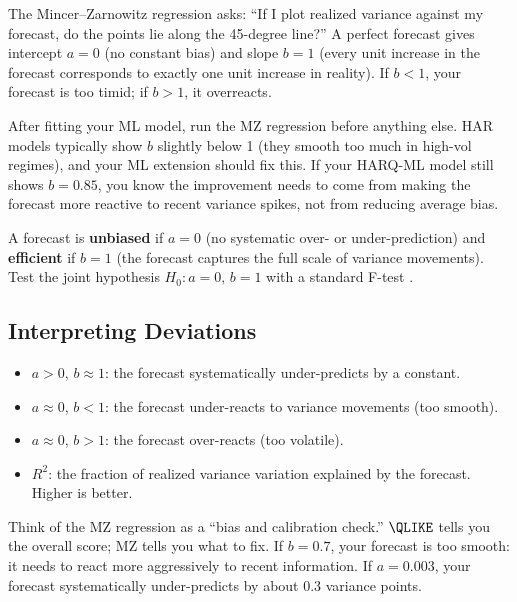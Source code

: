 \begin{intuition}
The Mincer--Zarnowitz regression asks: ``If I plot realized variance against my forecast, do the points lie along the 45-degree line?''
A perfect forecast gives intercept $a = 0$ (no constant bias) and slope $b = 1$ (every unit increase in the forecast corresponds to exactly one unit increase in reality).
If $b < 1$, your forecast is too timid; if $b > 1$, it overreacts.
\end{intuition}

\begin{projectconnection}
After fitting your ML model, run the MZ regression before anything else.
HAR models typically show $b$ slightly below 1 (they smooth too much in high-vol regimes), and your ML extension should fix this.
If your HARQ-ML model still shows $b = 0.85$, you know the improvement needs to come from making the forecast more reactive to recent variance spikes, not from reducing average bias.
\end{projectconnection}

\begin{definition}
A forecast is \textbf{unbiased} if $a = 0$ (no systematic over- or under-prediction) and \textbf{efficient} if $b = 1$ (the forecast captures the full scale of variance movements).
Test the joint hypothesis $H_0: a = 0, \, b = 1$ with a standard F-test \citep{MincerZarnowitz1969}.
\end{definition}

\subsection{Interpreting Deviations}

\begin{itemize}[nosep]
  \item $a > 0$, $b \approx 1$: the forecast systematically under-predicts by a constant.
  \item $a \approx 0$, $b < 1$: the forecast under-reacts to variance movements (too smooth).
  \item $a \approx 0$, $b > 1$: the forecast over-reacts (too volatile).
  \item $R^2$: the fraction of realized variance variation explained by the forecast. Higher is better.
\end{itemize}

\begin{intuition}
Think of the MZ regression as a ``bias and calibration check.''
$\QLIKE$ tells you the overall score; MZ tells you what to fix.
If $b = 0.7$, your forecast is too smooth: it needs to react more aggressively to recent information.
If $a = 0.003$, your forecast systematically under-predicts by about 0.3 variance points.
\end{intuition}


